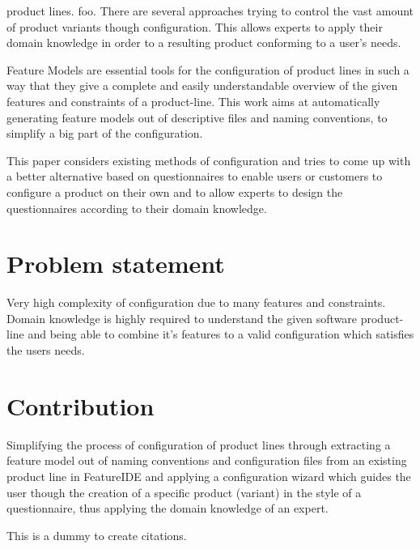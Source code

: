 % 
% 
% 
% 
 product lines. foo. There are several approaches trying to control the vast amount of product variants though configuration. This allows experts to apply their domain knowledge in order to a resulting product conforming to a user's needs.

Feature Models are essential tools for the configuration of product lines in such a way that they give a complete and easily understandable overview of the given features and constraints of a product-line. This work aims at automatically generating feature models out of descriptive files and naming conventions, to simplify a big part of the configuration.

This paper considers existing methods of configuration and tries to come up with a better alternative based on questionnaires to enable users or customers to configure a product on their own and to allow experts to design the questionnaires according to their domain knowledge.

\section*{Problem statement}
Very high complexity of configuration due to many features and constraints. Domain knowledge is highly required to understand the given software product-line and being able to combine it's features to a valid configuration which satisfies the users needs.

\section*{Contribution}

Simplifying the process of configuration of product lines through extracting a feature model out of naming conventions and configuration files from an existing product line in FeatureIDE and applying a configuration wizard which guides the user though the creation of a specific product (variant) in the style of a questionnaire, thus applying the domain knowledge of an expert.

This\cite{fpe} is\cite{qdc} a\cite{qbvm} dummy\cite{fmgp} to create citations.